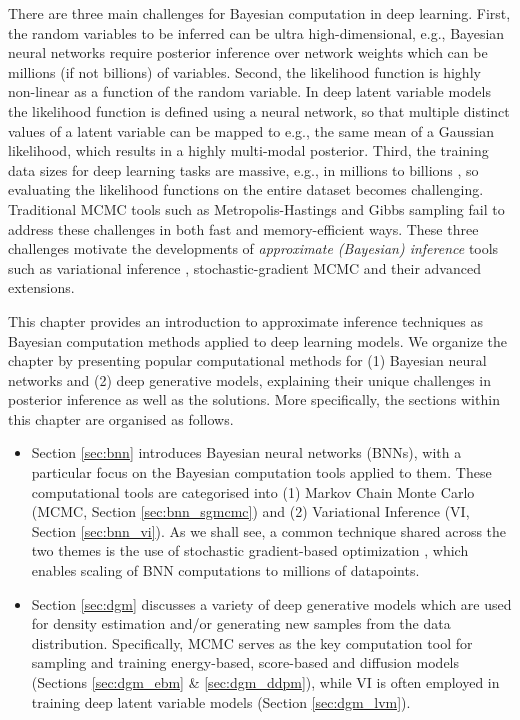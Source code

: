 There are three main challenges for Bayesian computation in deep learning. First, the random variables to be inferred can be ultra high-dimensional, e.g., Bayesian neural networks require posterior inference over network weights which can be millions (if not billions) of variables. Second, the likelihood function is highly non-linear as a function of the random variable. In deep latent variable models the likelihood function is defined using a neural network, so that multiple distinct values of a latent variable can be mapped to e.g., the same mean of a Gaussian likelihood, which results in a highly multi-modal posterior. Third, the training data sizes for deep learning tasks are massive, e.g., in millions \citep{deng2009imagenet} to billions \citep{schuhmann2022laion}, so evaluating the likelihood functions on the entire dataset becomes challenging.
%
Traditional MCMC tools such as Metropolis-Hastings \citep{metropolis1953equation} and Gibbs sampling \citep{gelfand2000gibbs} fail to address these challenges in both fast and memory-efficient ways. These three challenges motivate the developments of \emph{approximate (Bayesian) inference} tools such as variational inference \citep{jordan1999vi,beal:vi2003,li2018approx,zhang2018advances}, stochastic-gradient MCMC \citep{welling2011bayesian,ma2015complete,zhangcyclical} and their advanced extensions.

This chapter provides an introduction to approximate inference techniques as Bayesian computation methods applied to deep learning models. We organize the chapter by presenting popular computational methods for (1) Bayesian neural networks and (2) deep generative models, explaining their unique challenges in posterior inference as well as the solutions. More specifically, the sections within this chapter are organised as follows.
\begin{itemize}
    \item Section \ref{sec:bnn} introduces Bayesian neural networks (BNNs), with a particular focus on the Bayesian computation tools applied to them. These computational tools are categorised into (1) Markov Chain Monte Carlo (MCMC, Section \ref{sec:bnn_sgmcmc}) and (2) Variational Inference (VI, Section \ref{sec:bnn_vi}). As we shall see, a common technique shared across the two themes is the use of stochastic gradient-based optimization \citep{bottou:ol1998}, which enables scaling of BNN computations to millions of datapoints.

    \item Section \ref{sec:dgm} discusses a variety of deep generative models which are used for density estimation and/or generating new samples from the data distribution. Specifically, MCMC serves as the key computation tool for sampling and training energy-based, score-based and diffusion models (Sections \ref{sec:dgm_ebm} \& \ref{sec:dgm_ddpm}), while VI is often employed in training deep latent variable models (Section \ref{sec:dgm_lvm}).
\end{itemize}